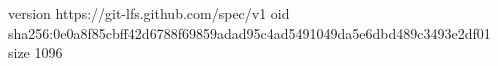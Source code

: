 version https://git-lfs.github.com/spec/v1
oid sha256:0e0a8f85cbff42d6788f69859adad95c4ad5491049da5e6dbd489c3493e2df01
size 1096
